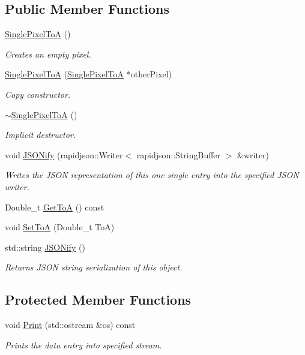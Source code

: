 \subsection*{Public Member Functions}
\begin{DoxyCompactItemize}
\item 
\hyperlink{classSinglePixelToA_a14b5fa35ac80341c180ee2948b0d533a}{Single\+Pixel\+To\+A} ()
\begin{DoxyCompactList}\small\item\em Creates an empty pixel. \end{DoxyCompactList}\item 
\hyperlink{classSinglePixelToA_a848f55b6ef644f7b61a276aa0ec5c479}{Single\+Pixel\+To\+A} (\hyperlink{classSinglePixelToA}{Single\+Pixel\+To\+A} $\ast$other\+Pixel)
\begin{DoxyCompactList}\small\item\em Copy constructor. \end{DoxyCompactList}\item 
\hyperlink{classSinglePixelToA_a976faa699430463edccf827d7686f941}{$\sim$\+Single\+Pixel\+To\+A} ()
\begin{DoxyCompactList}\small\item\em Implicit destructor. \end{DoxyCompactList}\item 
void \hyperlink{classSinglePixelToA_afef10aa4fe0b3c4d1676ada1d8ee4195}{J\+S\+O\+Nify} (rapidjson\+::\+Writer$<$ rapidjson\+::\+String\+Buffer $>$ \&writer)
\begin{DoxyCompactList}\small\item\em Writes the J\+S\+O\+N representation of this one single entry into the specified J\+S\+O\+N writer. \end{DoxyCompactList}\item 
Double\+\_\+t \hyperlink{classSinglePixelToA_ac63323a38df82131599539bf412e5c4e}{Get\+To\+A} () const 
\item 
void \hyperlink{classSinglePixelToA_a7c3836057703bd042c89997e3490d3d9}{Set\+To\+A} (Double\+\_\+t To\+A)
\item 
std\+::string \hyperlink{classSingleDataEntry_a9e48725016d6fbd6bd674d5b299dbb12}{J\+S\+O\+Nify} ()
\begin{DoxyCompactList}\small\item\em Returns J\+S\+O\+N string serialization of this object. \end{DoxyCompactList}\end{DoxyCompactItemize}
\subsection*{Protected Member Functions}
\begin{DoxyCompactItemize}
\item 
void \hyperlink{classSinglePixelToA_a8b9d4ef4082473c747157b9b2c1376b0}{Print} (std\+::ostream \&os) const 
\begin{DoxyCompactList}\small\item\em Prints the data entry into specified stream. \end{DoxyCompactList}\end{DoxyCompactItemize}


